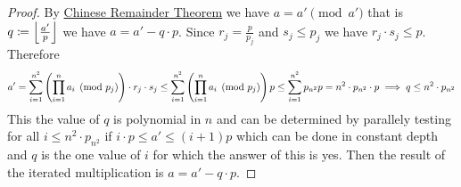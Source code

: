 \begin{proof}
	By \hyperref[crt]{Chinese Remainder Theorem} we have $a=a'\pmod{a'}$ that is $q\coloneqq \left\lfloor \frac{a'}{p}\right\rfloor$ we have $a=a'-q\cdot p$. Since $r_j=\frac{p}{p_j}$ and $s_j\leq p_j$ we have $r_j\cdot s_j\leq p$. Therefore $$a'= \sum_{i=1}^{n^2}\left( \prod\limits_{i=1}^n a_i\pmod{p_j} \right)\cdot r_j\cdot s_j\leq  \sum_{i=1}^{n^2}\left( \prod\limits_{i=1}^n a_i\pmod{p_j} \right)p\leq  \sum_{i=1}^{n^2}p_{n^2}p=n^2\cdot p_{n^2}\cdot p\implies q\leq n^2\cdot p_{n^2}$$ This the value of $q$ is  polynomial in $n$ and can be determined by parallely testing for all $i\leq n^2\cdot p_{n^2}$ if $i\cdot p\leq a'\leq (i+1)p$ which can be done in constant depth and $q$ is the one value of $i$ for which the answer of this is yes. Then the result of the iterated multiplication is $a=a'-q\cdot p$.
\end{proof}